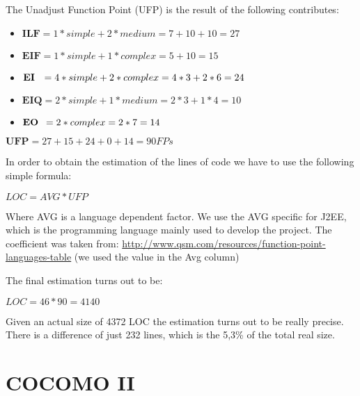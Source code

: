 \documentclass[10pt,a4paper,titlepage]{article}
\begin{document}
The Unadjust Function Point (UFP) is the result of the following contributes: 
\begin{itemize}
\item $\textbf{ILF} = 1*simple+2*medium=7+10+10=27$

\item $\textbf{EIF} = 1*simple+1*complex=5+10=15$

\item $\textbf{EI\hspace{7pt}} = 4*simple+2*complex=4*3+2*6=24$

\item $\textbf{EIQ} = 2*simple+1*medium=2*3+1*4=10$

\item $\textbf{EO\hspace{5pt}} = 2*complex=2*7=14$
\end{itemize}

$\textbf{UFP} = 27+15+24+0+14 = 90 {FPs}$

In order to obtain the estimation of the lines of code we have to use the following simple formula:

\begin{center}
$LOC= AVG * UFP$
\end{center}
 
Where AVG is a language dependent factor.
We use the AVG specific for J2EE, which is the programming language mainly used to develop the project. The coefficient was taken from: \url{http://www.qsm.com/resources/function-point-languages-table} (we used the value in the Avg column) 
 
 
The final estimation turns out to be: 

\begin{center}
$LOC = 46*90=4140$ 
\end{center}

 
Given an actual size of 4372 LOC the estimation turns out to be really precise.  
There is a difference of just 232 lines, which is the 5,3\% of the total real size. 

\pagebreak
\part{COCOMO II}
\end{document}
